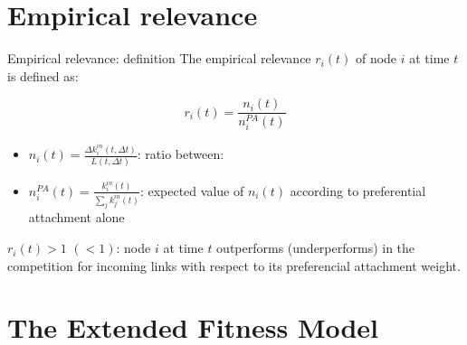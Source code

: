 \section{Empirical relevance}
\begin{frame}{Empirical relevance: definition}
    The \alert{empirical relevance} $r_i(t)$ of node $i$ at time $t$ is defined as:

    \[
        r_i(t) = \frac{n_i(t)}{n_i^{PA}(t)}
    \]

    \begin{itemize}
        \item $n_i(t) = \frac{\Delta k_i^{in}(t, \Delta t)}{L(t, \Delta t)}$: ratio between:

        \begin{itemize}
        \end{itemize}

        \item $n_i^{PA}(t) = \frac{k_i^{in}(t)}{\sum_j k_j^{in}(t)}$: expected value of $n_i(t)$ according to preferential attachment alone
    \end{itemize}

    $r_i(t) > 1$ \alert{$(< 1)$}: node $i$ at time $t$ outperforms \alert{(underperforms)} in the competition for incoming links with respect to its preferencial attachment weight.
\end{frame}

\section{The Extended Fitness Model}

